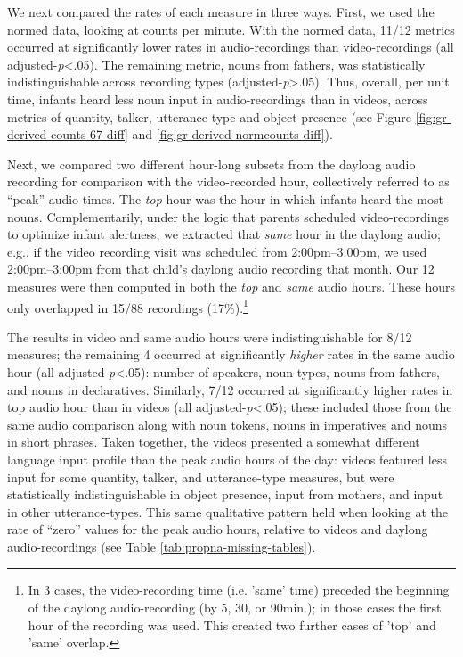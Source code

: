 \documentclass[man]{apa6}
\theoremstyle{definition}
\theoremstyle{definition}
\theoremstyle{definition}
\theoremstyle{remark}
\begin{document}
We next compared the rates of each measure in three ways. First, we used
the normed data, looking at counts per minute. With the normed data,
11/12 metrics occurred at significantly lower rates in audio-recordings
than video-recordings (all adjusted-\emph{p}\textless{}.05). The
remaining metric, nouns from fathers, was statistically
indistinguishable across recording types
(adjusted-\emph{p}\textgreater{}.05). Thus, overall, per unit time,
infants heard less noun input in audio-recordings than in videos, across
metrics of quantity, talker, utterance-type and object presence (see
Figure \ref{fig:gr-derived-counts-67-diff} and
\ref{fig:gr-derived-normcounts-diff}).

Next, we compared two different hour-long subsets from the daylong audio
recording for comparison with the video-recorded hour, collectively
referred to as \enquote{peak} audio times. The \emph{top} hour was the
hour in which infants heard the most nouns. Complementarily, under the
logic that parents scheduled video-recordings to optimize infant
alertness, we extracted that \emph{same} hour in the daylong audio;
e.g., if the video recording visit was scheduled from 2:00pm--3:00pm, we
used 2:00pm--3:00pm from that child's daylong audio recording that
month. Our 12 measures were then computed in both the \emph{top} and
\emph{same} audio hours. These hours only overlapped in 15/88 recordings
(17\%).\footnote{In 3 cases, the video-recording time (i.e. 'same' time) preceded the beginning of the daylong audio-recording (by 5, 30, or 90min.); in those cases the first hour of the recording was used. This created two further cases of 'top' and 'same' overlap.}

The results in video and same audio hours were indistinguishable for
8/12 measures; the remaining 4 occurred at significantly \emph{higher}
rates in the same audio hour (all adjusted-\emph{p}\textless{}.05):
number of speakers, noun types, nouns from fathers, and nouns in
declaratives. Similarly, 7/12 occurred at significantly higher rates in
top audio hour than in videos (all adjusted-\emph{p}\textless{}.05);
these included those from the same audio comparison along with noun
tokens, nouns in imperatives and nouns in short phrases. Taken together,
the videos presented a somewhat different language input profile than
the peak audio hours of the day: videos featured less input for some
quantity, talker, and utterance-type measures, but were statistically
indistinguishable in object presence, input from mothers, and input in
other utterance-types. This same qualitative pattern held when looking
at the rate of \enquote{zero} values for the peak audio hours, relative
to videos and daylong audio-recordings (see Table
\ref{tab:propna-missing-tables}).
\end{document}
